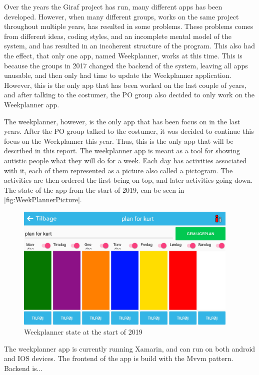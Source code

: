 Over the years the Giraf project has run, many different apps has been developed. However, when many different groups, works on the same project throughout multiple years,  has resulted in some problems. \newline
These problems comes from different ideas, coding styles, and an incomplete mental model of the system, and has resulted in an incoherent structure of the program.  \newline
This also had the effect, that only one app, named Weekplanner, works at this time. This is because the groups in 2017 \cite{SW608F18} changed the backend of the system, leaving all apps unusable, and then only had time to update the Weekplanner application. \newline
However, this is the only app that has been worked on the last couple of years, and after talking to the costumer, the \gls{PO} group also decided to only work on the Weekplanner app.  \newline 

\par \noindent
The weekplanner, however, is the only app that has been focus on in the last years. After the \gls{PO} group talked to the costumer, it was decided to continue this focus on the Weekplanner this year. Thus, this is the only app that will be described in this report.  \newline
The weekplanner app is meant as a tool for showing autistic people what they will do for a week. Each day has activities associated with it, each of them represented as a picture also called a pictogram. The activities are then ordered the first being on top, and later activities going down. The state of the app from the start of 2019, can be seen in \autoref{fig:WeekPlannerPicture}.

\begin{figure}[ht]
        \begin{center}
            \includegraphics[width=0.95\textwidth]{figures/WeekPlannerPicture}
        \end{center}
        \caption{Weekplanner state at the start of 2019}
        \label{fig:WeekPlannerPicture}
\end{figure}

\noindent
The weekplanner app is currently running Xamarin, and can run on both android and IOS devices. The frontend of the app is build with the \gls{Mvvm} pattern. 
Backend is... %
